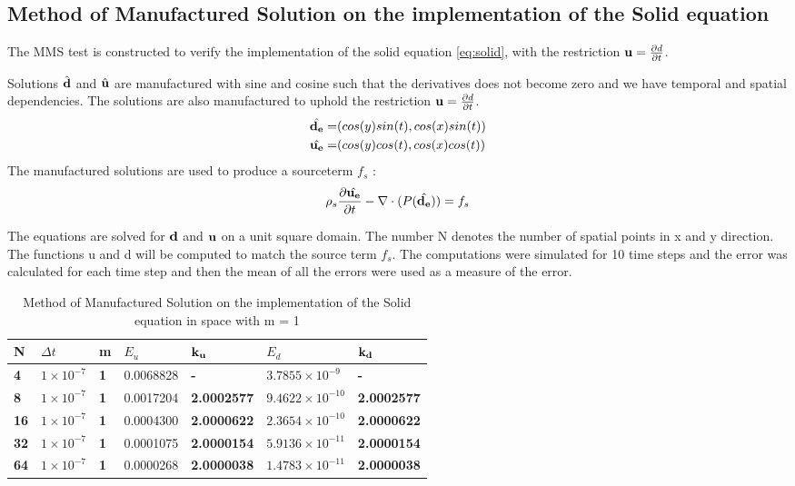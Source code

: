 \subsection{Method of Manufactured Solution on the implementation of the Solid equation}
The MMS test is constructed to verify the implementation of the solid equation \eqref{eq:solid}, with the restriction $\bold{u}=\frac{\partial d}{\partial t}$.

Solutions $\hat{\bold{d}}$ and $\hat{\bold{u}}$ are manufactured with sine and cosine such that the derivatives does not become zero and we have temporal and spatial dependencies.
The solutions are also manufactured to uphold the restriction $\bold{u}=\frac{\partial d}{\partial t}$.
\begin{align*}
\hat{\bold{d_e}} =& ( cos(y)sin(t) , cos(x)sin(t) )\\
\hat{\bold{u_e}} =& ( cos(y)cos(t), cos(x)cos(t) )
\end{align*}
The manufactured solutions are used to produce a sourceterm $f_s$ :
\begin{equation}
\rho_s \frac{\partial \hat{\bold{u_e}}}{\partial t} - \nabla \cdot ( P(\hat{\bold{d_e}}) ) = f_s 
\end{equation}

The equations are solved for $\bold{d}$ and $\bold{u}$ on a unit square domain. The number N denotes the number of spatial points in x and y direction. The functions u and d will be computed to match the source term $f_s$. 
The computations were simulated for 10 time steps and the error was calculated for each time step and then the mean of all the errors were used as a measure of the error.
\begin{table}[H]
\centering
\caption{Method of Manufactured Solution on the implementation of the Solid equation in space with m = 1}
\label{tab:MMS_SOLID_SPACE}
\begin{tabular}{|l|l|l|l|l|l|l|}
\hline
\textbf{N} & $\Delta t$ & \textbf{m} & $E_u $ & $\bold{k_u}$ & $E_d $ & $\bold{k_d}$ \\ \hline
\textbf{4} & $1\times10^{-7}$ & \textbf{1} & 0.0068828 & \textbf{-} & $3.7855 \times 10^{-9} $ & \textbf{-} \\ \hline
\textbf{8} & $1\times10^{-7}$ & \textbf{1} & 0.0017204 & \textbf{2.0002577} & $9.4622 \times 10^{-10} $ & \textbf{2.0002577} \\ \hline
\textbf{16} & $1\times10^{-7}$ & \textbf{1} & 0.0004300 & \textbf{2.0000622} & $2.3654 \times 10^{-10} $ & \textbf{2.0000622} \\ \hline
\textbf{32} & $1\times10^{-7}$ & \textbf{1} & 0.0001075 & \textbf{2.0000154} & $5.9136 \times 10^{-11} $ & \textbf{2.0000154} \\ \hline
\textbf{64} & $1\times10^{-7}$ & \textbf{1} & 0.0000268 & \textbf{2.0000038} & $1.4783 \times 10^{-11} $ & \textbf{2.0000038} \\ \hline
\end{tabular}
\end{table}

